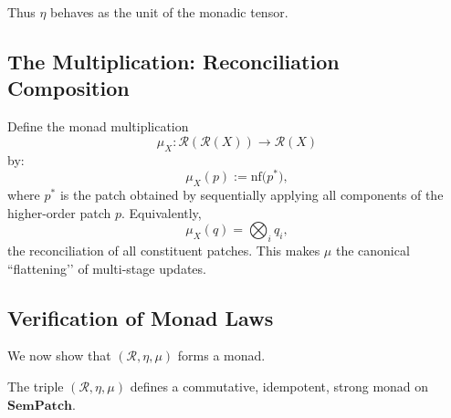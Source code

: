 Thus $\eta$ behaves as the unit of the monadic tensor.

\subsection{The Multiplication: Reconciliation Composition}
\label{subsec:79-5-multiplication}

Define the monad multiplication
\[
\mu_X : \mathcal{R}(\mathcal{R}(X)) \longrightarrow \mathcal{R}(X)
\]
by:
\[
\mu_X(p) := \mathrm{nf}\!\bigl(p^{\!*}\bigr),
\]
where $p^{\!*}$ is the patch obtained by sequentially applying all components
of the higher-order patch $p$.  
Equivalently,
\[
\mu_X(q) = \bigotimes_{i} q_i,
\]
the reconciliation of all constituent patches.  
This makes $\mu$ the canonical ``flattening’’ of multi-stage updates.

\subsection{Verification of Monad Laws}
\label{subsec:79-5-laws}

We now show that $(\mathcal{R},\eta,\mu)$ forms a monad.

\begin{theorem}
\label{thm:79-reconciliation-monad}
The triple $(\mathcal{R},\eta,\mu)$ defines a commutative, idempotent,
strong monad on $\mathbf{SemPatch}$.
\end{theorem}

